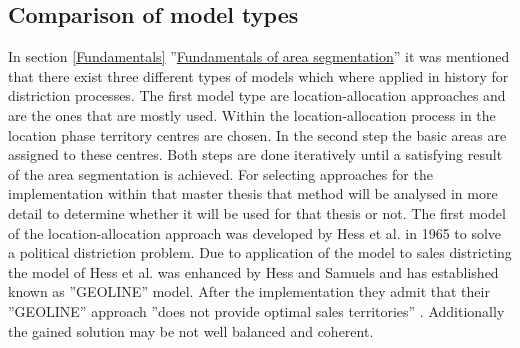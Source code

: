 \subsection{Comparison of model types}\label{comparison}
In section \ref{Fundamentals} ''\hyperref[Fundamentals]{Fundamentals of area segmentation}'' it was mentioned that there exist three different types of models which where applied in history for distriction processes. The first model type are location-allocation approaches and are the ones that are mostly used. Within the location-allocation process in the location phase territory centres are chosen. In the second step the basic areas are assigned to these centres. Both steps are done iteratively until a satisfying result of the area segmentation is achieved. For selecting approaches for the implementation within that master thesis that method will be analysed in more detail to determine whether it will be used for that thesis or not. The first model of the location-allocation approach was developed by Hess et al. \cite{hess} in 1965 to solve a political distriction problem. Due to application of the model to sales districting the model of Hess et al. \cite{hess} was enhanced by Hess and Samuels \cite{hessstuart} and has established known as ''GEOLINE'' model. After the implementation they admit that their ''GEOLINE'' approach ''does not provide optimal sales territories'' \cite{hessstuart}. Additionally the gained solution may be not well balanced and coherent.
